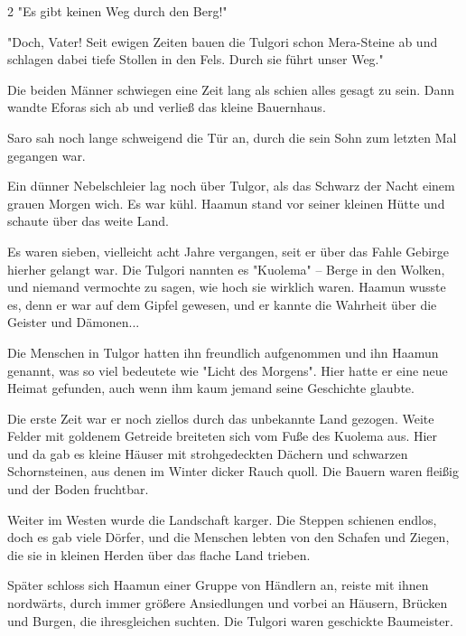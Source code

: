 \documentclass[10pt, a4paper, oneside]{book}
\begin{document}
\begin{multicols}{2}
"Es gibt keinen Weg durch den Berg!"

"Doch, Vater! Seit ewigen Zeiten bauen die Tulgori schon Mera-Steine ab und schlagen dabei tiefe Stollen in den Fels. Durch sie führt unser Weg."

Die beiden Männer schwiegen eine Zeit lang als schien alles gesagt zu sein. Dann wandte Eforas sich ab und verließ das kleine Bauernhaus.

Saro sah noch lange schweigend die Tür an, durch die sein Sohn zum letzten Mal gegangen war.\bigskip

Ein dünner Nebelschleier lag noch über Tulgor, als das Schwarz der Nacht einem grauen Morgen wich. Es war kühl. Haamun stand vor seiner kleinen Hütte und schaute über das weite Land.

Es waren sieben, vielleicht acht Jahre vergangen, seit er über das Fahle Gebirge hierher gelangt war. Die  Tulgori nannten es "Kuolema" – Berge in den Wolken, und niemand vermochte zu sagen, wie hoch sie wirklich waren. Haamun wusste es, denn er war auf dem Gipfel gewesen, und er kannte die Wahrheit über die Geister und Dämonen...

Die Menschen in Tulgor hatten ihn freundlich aufgenommen und ihn Haamun genannt, was so viel bedeutete wie "Licht des Morgens". Hier hatte er eine neue Heimat gefunden, auch wenn ihm kaum jemand seine Geschichte glaubte.\bigskip

Die erste Zeit war er noch ziellos durch das unbekannte Land gezogen. Weite Felder mit goldenem Getreide breiteten sich vom Fuße des Kuolema aus. Hier und da gab es kleine Häuser mit strohgedeckten Dächern und schwarzen Schornsteinen, aus denen im Winter dicker Rauch quoll. Die Bauern waren fleißig und der Boden fruchtbar.

Weiter im Westen wurde die Landschaft karger. Die Steppen schienen endlos, doch es gab viele Dörfer, und die Menschen lebten von den Schafen und Ziegen, die sie in kleinen Herden über das flache Land trieben.\bigskip

Später schloss sich Haamun einer Gruppe von Händlern an, reiste mit ihnen nordwärts, durch immer größere Ansiedlungen und vorbei an Häusern, Brücken und Burgen, die ihresgleichen suchten. Die Tulgori waren geschickte Baumeister.


\end{multicols}
\end{document}
